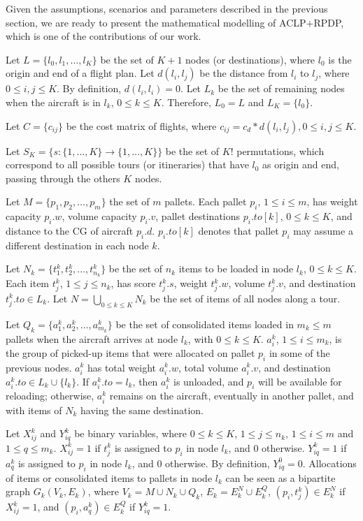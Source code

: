 \documentclass[preprint,authoryear]{elsarticle}
\begin{document}
Given the assumptions, scenarios and parameters described in the previous section, we are ready to present the mathematical modelling of ACLP+RPDP, which is one of the contributions of our work.

Let $L = \{ l_0, l_1, \ldots, l_K \}$ be the set of $K+1$ nodes (or destinations), where $l_0$ is the origin and end of a flight plan. Let $d(l_i,l_j)$ be the distance from $l_i$ to $l_j$, where $0 \leq i,j \leq K$. By definition, $d(l_i,l_i)=0$. Let $L_k$ be the set of remaining nodes when the aircraft is in $l_k$, $0 \leq k \leq K$. Therefore, $L_0=L$ and $L_K = \{ l_0 \}$.

Let $C=\{c_{ij}\}$ be the cost matrix of flights, where $c_{ij} = c_d*d(l_i,l_j), 0 \leq i,j \leq K$.

Let $S_K = \{s: \{1, \dots, K\} \rightarrow \{1, \dots, K\} \}$ be the set of $K!$ permutations, which correspond to all possible tours (or itineraries) that have $l_0$ as origin and end, passing through the others $K$ nodes.

Let $M = \{p_1, p_2, \ldots, p_m \}$ the set of $m$ pallets. Each pallet $p_i$, $1 \leq i \leq m$, has weight capacity $p_i.w$, volume capacity $p_i.v$, pallet destinations $p_i.to[k]$, $0 \leq k \leq K$, and distance to the CG of aircraft $p_i.d$. $p_i.to[k]$ denotes that pallet $p_i$ may assume a different destination in each node $k$.

Let $N_k = \{t^k_1, t^k_2, \ldots, t^k_{n_k} \}$ be the set of $n_k$ items to be loaded in node $l_k$, $0 \leq k \leq K$. Each item $t^k_j$, $1 \leq j \leq n_k$, has score $t^k_j.s$, weight $t^k_j.w$, volume $t^k_j.v$, and destination $t^k_j.to \in L_k$. Let $N = \bigcup_{0 \leq k \leq K} N_k$ be the set of items of all nodes along a tour.

Let $Q_k = \{a^k_1, a^k_2, \ldots, a^k_{m_k} \}$ be the set of consolidated items loaded in $m_k \leq m$ pallets when the aircraft arrives at node $l_k$, with $0 \leq k \leq K$. $a^k_i$, $1 \leq i \leq m_k$, is the group of picked-up items that were allocated on pallet $p_i$ in some of the previous nodes. $a^k_i$ has total weight $a^k_i.w$, total volume $a^k_i.v$, and destination $a^k_i.to \in L_k \cup \{l_k\}$. If $a^k_i.to = l_k$, then $a^k_i$ is unloaded, and $p_i$ will be available for reloading; otherwise, $a^k_i$ remains on the aircraft, eventually in another pallet, and with items of $N_k$ having the same destination.

Let $X_{ij}^k$ and $Y_{iq}^k$ be binary variables, where $0 \leq k \leq K$, $1 \leq j \leq n_k$, $1 \leq i \leq m$ and $1 \leq q \leq m_k$. $X_{ij}^k = 1$ if $t_j^k$ is assigned to $p_i$ in node $l_k$, and 0 otherwise. $Y_{iq}^k = 1$ if $a_q^k$ is assigned to $p_i$ in node $l_k$, and 0 otherwise. By definition, $Y_{iq}^0=0$. Allocations of items or consolidated items to pallets in node $l_k$ can be seen as a bipartite graph $G_k(V_k, E_k)$, where $V_k = M \cup N_k \cup Q_k$, $E_k = E^N_k \cup E^Q_k$, $(p_i, t_j^k) \in E^N_k$ if $X_{ij}^k = 1$, and $(p_i, a_q^k) \in E^Q_k$ if $Y_{iq}^k = 1$.
\end{document}
